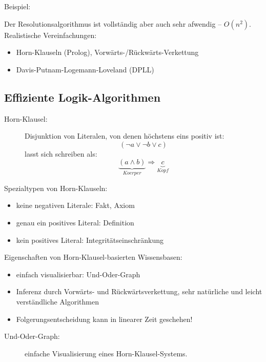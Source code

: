 Beispiel:

Der Resolutionsalgorithmus ist vollständig aber auch sehr afwendig -- $O(n^2)$. Realistische Vereinfachungen:
\begin{itemize}
\item Horn-Klauseln (Prolog), Vorwärts-/Rückwärts-Verkettung
\item Davis-Putnam-Logemann-Loveland (DPLL)
\end{itemize}

\subsection{Effiziente Logik-Algorithmen}

\begin{description}
\item[Horn-Klausel:] Disjunktion von Literalen, von denen höchstens eins positiv ist: $$(\neg a \vee \neg b \vee c)$$ lasst sich schreiben als: $$\underbrace{(a \wedge b)}_{Koerper} \Rightarrow \underbrace{c}_{Kopf}$$
\end{description}
Spezialtypen von Horn-Klauseln:
\begin{itemize}
\item keine negativen Literale: Fakt, Axiom
\item genau ein positives Literal: Definition
\item kein positives Literal: Integritätseinschränkung
\end{itemize}
Eigenschaften von Horn-Klausel-basierten Wissensbasen:
\begin{itemize}
\item einfach visualisierbar: Und-Oder-Graph
\item Inferenz durch Vorwärts- und Rückwärtsverkettung, sehr natürliche und leicht verständliche Algorithmen
\item Folgerungsentscheidung kann in linearer Zeit geschehen!
\end{itemize}
\begin{description}
\item[Und-Oder-Graph:] einfache Visualisierung eines Horn-Klausel-Systems.
\end{description}


